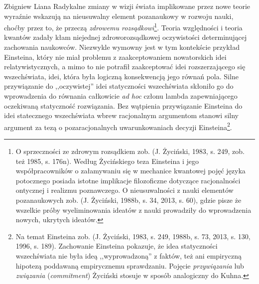 \begin{artplenv}{Zbigniew Liana}
Radykalne zmiany w wizji świata implikowane przez nowe teorie wyraźnie wskazują na nieusuwalny element pozanaukowy w rozwoju
nauki, choćby przez to, że przeczą \textit{zdrowemu rozsądkowi}\footnote{O sprzeczności ze zdrowym rozsądkiem
zob. \label{ref:RND3LfNDVSWRv}(J. Życiński, 1983, s. 249, zob. też 1985, s. 176n). Według Życińskiego teza Einsteina i jego
współpracowników o załamywaniu się w mechanice kwantowej pojęć języka potocznego posiada istotne implikacje
filozoficzne dotyczące racjonalności ontycznej i realizmu poznawczego. O nieusuwalności z nauki elementów pozanaukowych
zob. \label{ref:RNDhn4h2RTiN2}(J. Życiński, 1988b, s. 34, 2013, s. 60), gdzie pisze że wszelkie próby wyeliminowania
ideatów z nauki prowadziły do wprowadzenia nowych, ukrytych ideatów.}. Teoria względności i teoria kwantów zadały kłam
niejednej zdroworozsądkowej oczywistości determinującej zachowania naukowców. Niezwykle wymowny jest w tym kontekście 
przykład Einsteina, który nie miał problemu z zaakceptowaniem nowatorskich idei relatywistycznych, a mimo to nie
potrafił zaakceptować idei rozszerzającego się wszechświata, idei, która była logiczną konsekwencją jego równań pola.
Silne przywiązanie do ,,oczywistej'' idei statyczności wszechświata skłoniło go do wprowadzenia do równania całkowicie
\textit{ad hoc} członu lambda zapewniającego oczekiwaną statyczność rozwiązania. Bez wątpienia przywiązanie Einsteina do
idei statecznego wszechświata wbrew racjonalnym argumentom stanowi silny argument za tezą o pozaracjonalnych
uwarunkowaniach decyzji Einsteina\footnote{Na temat Einsteina zob. \label{ref:RNDOEPytE2GkR}(J. Życiński, 1983, s. 249,
1988b, s. 73, 2013, s. 130, 1996, s. 189). Zachowanie Einsteina pokazuje, że idea statyczności wszechświata nie była
ideą ,,wyprowadzoną'' z faktów, też ani empiryczną hipotezą poddawaną empirycznemu sprawdzaniu. Pojęcie
\textit{przywiązania} lub\textit{ związania }(\textit{commitment}) Życiński stosuje w sposób analogiczny do Kuhna.}.


\end{artplenv}
